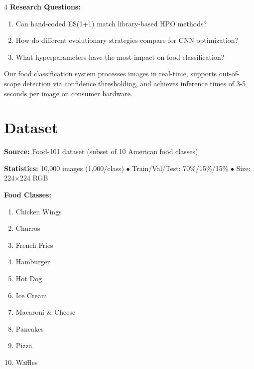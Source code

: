 \documentclass[a0,landscape]{a0poster}
\begin{document}
\begin{multicols*}{4}
\textbf{Research Questions:}
\begin{enumerate}
    \item Can hand-coded ES(1+1) match library-based HPO methods?
    \item How do different evolutionary strategies compare for CNN optimization?
    \item What hyperparameters have the most impact on food classification?
\end{enumerate}

Our food classification system processes images in real-time, supports out-of-scope detection via confidence thresholding, and achieves inference times of 3-5 seconds per image on consumer hardware.

\color{Teal}
\section*{Dataset}
\color{Black}
\textbf{Source:} Food-101 dataset (subset of 10 American food classes)

\textbf{Statistics:} 10,000 images (1,000/class) $\bullet$ Train/Val/Test: 70\%/15\%/15\% $\bullet$ Size: 224$\times$224 RGB

\textbf{Food Classes:}
\begin{minipage}[t]{0.48\linewidth}
\begin{enumerate}
    \item Chicken Wings
    \item Churros
    \item French Fries
    \item Hamburger
    \item Hot Dog
\end{enumerate}
\end{minipage}
\hfill
\begin{minipage}[t]{0.48\linewidth}
\begin{enumerate}
\setcounter{enumi}{5}
    \item Ice Cream
    \item Macaroni \& Cheese
    \item Pancakes
    \item Pizza
    \item Waffles
\end{enumerate}
\end{minipage}


\end{multicols*}
\end{document}

